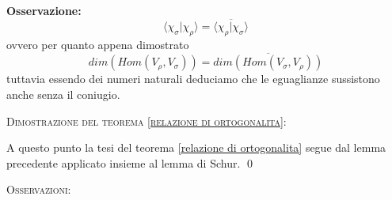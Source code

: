 \documentclass[11pt]{article}
\theoremstyle{plain}
\theoremstyle{definition}
\theoremstyle{remark}
\begin{document}
\textbf{Osservazione:}
\[\langle \chi_\sigma | \chi_\rho \rangle=\overline{\langle \chi_\rho | \chi_\sigma \rangle}\]
ovvero per quanto appena dimostrato
\[ dim(Hom(V_\rho, V_\sigma))=\overline{dim(Hom(V_\sigma, V_\rho))}\]
tuttavia essendo dei numeri naturali deduciamo che le eguaglianze sussistono anche senza il coniugio.












\textsc{Dimostrazione del teorema \ref{relazione di ortogonalita}:}

A questo punto la tesi del teorema \ref{relazione di ortogonalita} segue dal lemma precedente applicato insieme al lemma di Schur. \qed


\textsc{Osservazioni:}
\end{document}
